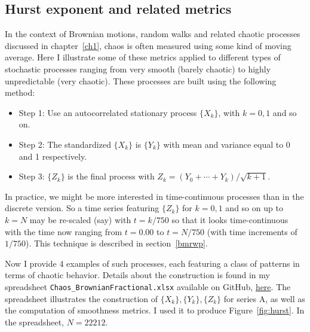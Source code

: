 \documentclass[oneside,10pt]{book}
\begin{document}
\subsection{Hurst exponent and related metrics}

In the context of \textcolor{index}{Brownian motions}, 
 \textcolor{index}{random walks} and related chaotic processes discussed in chapter~\ref{ch1}, chaos is
 often measured using some kind of moving average. Here I illustrate some of these metrics applied to different types of stochastic processes  
 ranging from very smooth (barely chaotic) to highly unpredictable (very chaotic). These processes are built using the following method: 
\vspace{1ex}
\begin{itemize}
\item[]Step 1: Use an autocorrelated \textcolor{index}{stationary process} $\{X_k\}$, with $k=0,1$ and so on.
\item[]Step 2: The standardized $\{X_k\}$ is $\{Y_k\}$ with mean and variance equal to 0 and 1 respectively. 
\item[]Step 3: $\{Z_k\}$ is the final process with $Z_k = (Y_0 + \cdots + Y_{k})/\sqrt{k+1}$.
\end{itemize}\vspace{1ex}
In practice, we might be more interested in time-continuous processes than in the discrete version. So a time series featuring $\{Z_k\}$ 
for $k=0,1$ and so on up to $k=N$ may be re-scaled (say) with $t=k/750$ so that it looks time-continuous with the time now ranging from $t=0.00$ to $t=N/750$ (with time increments of $1/750$). This technique is described in section~\ref{bmrwp}. 

Now I provide 4 examples of such processes, each featuring a class of patterns in terms of chaotic behavior. Details about the construction is found in
 my spreadsheet \texttt{Chaos\_BrownianFractional.xlsx} available on GitHub, \href{https://github.com/VincentGranville/Stochastic-Processes/blob/master/chaos_BrownianFractional.xlsx}{here}. The spreadsheet illustrates the construction 
 of $\{X_k\}, \{Y_k\}, \{Z_k\}$ for series A, as well as the computation of smoothness metrics.
 I used it to produce Figure~\ref{fig:hurst}. In the spreadsheet, $N = \num{22212}$.\vspace{1ex}
\end{document}
